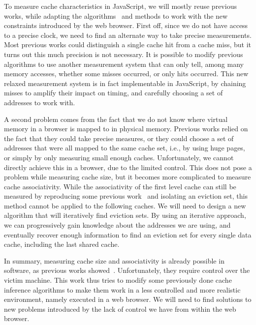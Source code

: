 \documentclass[a4paper,11pt,oneside]{report}
\begin{document}

To measure cache characteristics in JavaScript, we will mostly reuse previous works, while adapting the algorithms~\cite{aleph_spectre} and methods to work with the new constraints introduced by the web browser. First off, since we do not have access to a precise clock, we need to find an alternate way to take precise measurements. Most previous works could distinguish a single cache hit from a cache miss, but it turns out this much precision is not necessary. It is possible to modify previous algorithms to use another measurement system that can only tell, among many memory accesses, whether some misses occurred, or only hits occurred. This new relaxed measurement system is in fact implementable in JavaScript, by chaining misses to amplify their impact on timing, and carefully choosing a set of addresses to work with.


A second problem comes from the fact that we do not know where virtual memory in a browser is mapped to in physical memory. Previous works relied on the fact that they could take precise measures, or they could choose a set of addresses that were all mapped to the same cache set, i.e., by using huge pages, or simply by only measuring small enough caches. Unfortunately, we cannot directly achieve this in a browser, due to the limited control. This does not pose a problem while measuring cache size, but it becomes more complicated to measure cache associativity. While the associativity of the first level cache can still be measured by reproducing some previous work~\cite{eviction_sets} and isolating an eviction set, this method cannot be applied to the following caches. We will need to design a new algorithm that will iteratively find eviction sets. By using an iterative approach, we can progressively gain knowledge about the addresses we are using, and eventually recover enough information to find an eviction set for every single data cache, including the last shared cache.


In summary, measuring cache size and associativity is already possible in software, as previous works showed~\cite{abel}. Unfortunately, they require control over the victim machine. 
This work thus tries to modify some previously done cache inference algorithms to make them work in a less controlled and more realistic environment, namely executed in a web browser. 
We will need to find solutions to new problems introduced by the lack of control we have from within the web browser.
\end{document}
